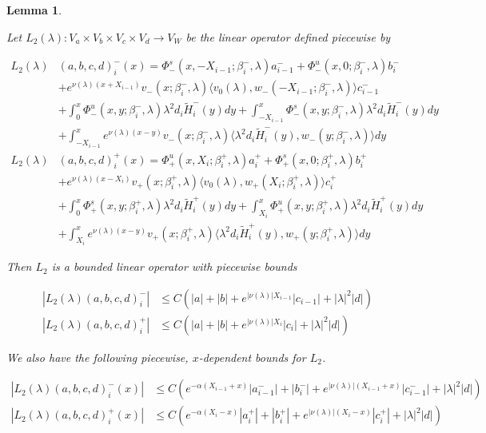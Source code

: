 \documentclass[12pt]{article}
\newtheorem{lemma}{Lemma}
\begin{document}

\begin{lemma}\label{L2}

Let $L_2(\lambda): V_a \times V_b \times V_c \times V_d \rightarrow V_W$ be the linear operator defined piecewise by

\begin{align*}
L_2(\lambda)&(a,b,c,d)_i^-(x) = \Phi^s_-(x, -X_{i-1}; \beta_i^-, \lambda)a_{i-1}^- + \Phi^u_-(x, 0; \beta_i^-, \lambda)b_i^- \\
&+ e^{\nu(\lambda)(x+X_{i-1})} v_-(x; \beta_i^-, \lambda) \langle v_0(\lambda), w_-(-X_{i-1}; \beta_i^-, \lambda) \rangle c_{i-1}^- \\
&+ \int_0^x \Phi^u_-(x, y; \beta_i^-, \lambda)\lambda^2 d_i \tilde{H}_i^-(y) dy + \int_{-X_{i-1}}^x \Phi^s_-(x, y; \beta_i^-, \lambda) \lambda^2 d_i \tilde{H}_i^-(y) dy \\
&+ \int_{-X_{i-1}}^x
e^{\nu(\lambda)(x-y)} v_-(x; \beta_i^-, \lambda) \langle \lambda^2 d_i \tilde{H}_i^-(y), w_-(y; \beta_i^-, \lambda) \rangle dy \\
L_2(\lambda)&(a,b,c,d)_i^+(x) = \Phi^u_+(x, X_i; \beta_i^+, \lambda)a_i^+ + \Phi^s_+(x, 0; \beta_i^+, \lambda)b_i^+ \\
&+ e^{\nu(\lambda)(x - X_i)} v_+(x; \beta_i^+, \lambda) \langle v_0(\lambda), w_+(X_i; \beta_i^+, \lambda) \rangle c_i^+ \\
&+ \int_0^x \Phi^s_+(x, y; \beta_i^+, \lambda) \lambda^2 d_i \tilde{H}_i^+(y) dy + \int_{X_i}^x \Phi^u_+(x, y; \beta_i^+, \lambda) \lambda^2 d_i \tilde{H}_i^+(y) dy \\
&+ \int_{X_i}^x e^{\nu(\lambda)(x-y)} v_+(x; \beta_i^+, \lambda) \langle \lambda^2 d_i \tilde{H}_i^+(y), w_+(y; \beta_i^+, \lambda) \rangle dy
\end{align*}

Then $L_2$ is a bounded linear operator with piecewise bounds

\begin{align*}\label{L2bound}
|L_2(\lambda)(a,b,c,d)_i^-| &\leq C \left( |a| + |b| + e^{|\nu(\lambda)|X_{i-1}}|c_{i-1}| + |\lambda|^2 |d| \right) \\
|L_2(\lambda)(a,b,c,d)_i^+| &\leq C \left( |a| + |b| + e^{|\nu(\lambda)|X_i}|c_i| + |\lambda|^2 |d| \right)
\end{align*}

We also have the following piecewise, $x$-dependent bounds for $L_2$.

\begin{align*}
|L_2(\lambda)(a,b,c,d)_i^-(x)| &\leq C (e^{-\alpha(X_{i-1} + x)}|a_{i-1}^-| + |b_i^-| + e^{|\nu(\lambda)|(X_{i-1} + x)} |c_{i-1}^-| + |\lambda|^2 |d| ) \\
|L_2(\lambda)(a,b,c,d)_i^+(x)| &\leq C (e^{-\alpha(X_i - x)}|a_i^+| + |b_i^+| + e^{|\nu(\lambda)|(X_i - x)} |c_i^+| + |\lambda|^2 |d| ) 
\end{align*}


\end{lemma}
\end{document}
